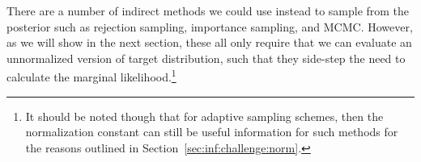 There are a number of indirect methods we could use instead to sample from the posterior
such as rejection sampling, importance sampling, and MCMC.  However, as we will show
in the next section, these all only require that we can evaluate an unnormalized version of
target distribution, such that they side-step the need to calculate the marginal 
likelihood.\footnote{It should be noted though that for adaptive sampling schemes,
	then the normalization constant
	can still be useful information for such methods for the reasons outlined in 
	Section~\ref{sec:inf:challenge:norm}.}